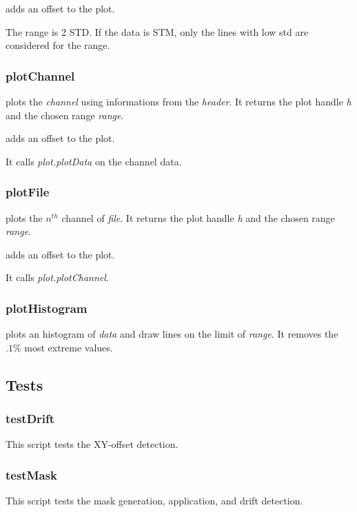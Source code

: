  adds an offset to the plot.
\edf

The range is 2 STD. If the data is STM, only the lines with low std are considered for the range.

\subsubsection{plotChannel}
\bdf
{} plots the \emph{channel} using informations from the \emph{header}. It returns the plot handle \emph{h} and the chosen range \emph{range}.

 adds an offset to the plot.
\edf

It calls \emph{plot.plotData} on the channel data.

\subsubsection{plotFile}


\bdf
{} plots the $n^{th}$ channel of \emph{file}. It returns the plot handle \emph{h} and the chosen range \emph{range}.

 adds an offset to the plot.
\edf

It calls \emph{plot.plotChannel}. 

\subsubsection{plotHistogram}
\bdf
{} plots an histogram of \emph{data} and draw lines on the limit of \emph{range}. It removes the $.1\%$ most extreme values. 
\edf

\subsection{Tests}

\subsubsection{testDrift}
This script tests the XY-offset detection.

\subsubsection{testMask}
This script tests the mask generation, application, and drift detection.

